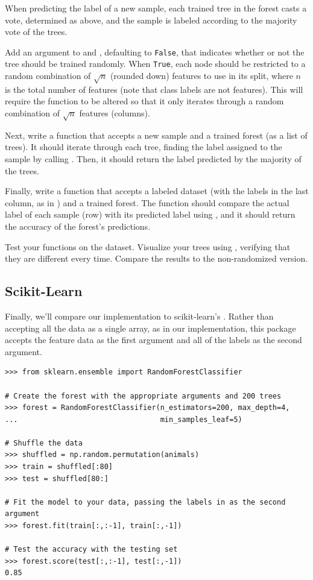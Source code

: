 When predicting the label of a new sample, each trained tree in the forest casts a vote, determined as above, and the sample is labeled according to the majority vote of the trees.

\begin{problem}
Add an argument  to  and , defaulting to \texttt{False}, that indicates whether or not the tree should be trained randomly.
When \texttt{True}, each node should be restricted to a random combination of $\sqrt{n}$ (rounded down) features to use in its split, where $n$ is the total number of features (note that class labels are not features).
This will require the function  to be altered so that it only iterates through a random combination of $\sqrt{n}$ features (columns).

Next, write a function  that accepts a new sample and a trained forest (as a list of trees).
It should iterate through each tree, finding the label assigned to the sample by calling .
Then, it should return the label predicted by the majority of the trees.

Finally, write a function  that accepts a labeled dataset (with the labels in the last column, as in ) and a trained forest.
The function should compare the actual label of each sample (row) with its predicted label using , and it should return the accuracy of the forest's predictions.

Test your functions on the  dataset.
Visualize your trees using , verifying that they are different every time.
Compare the results to the non-randomized version.
\end{problem}

\subsection*{Scikit-Learn}

Finally, we'll compare our implementation to scikit-learn's .
Rather than accepting all the data as a single array, as in our implementation, this package accepts the feature data as the first argument and all of the labels as the second argument.

\begin{lstlisting}
>>> from sklearn.ensemble import RandomForestClassifier

# Create the forest with the appropriate arguments and 200 trees
>>> forest = RandomForestClassifier(n_estimators=200, max_depth=4,
...									min_samples_leaf=5)

# Shuffle the data
>>> shuffled = np.random.permutation(animals)
>>> train = shuffled[:80]
>>> test = shuffled[80:]

# Fit the model to your data, passing the labels in as the second argument
>>> forest.fit(train[:,:-1], train[:,-1])

# Test the accuracy with the testing set
>>> forest.score(test[:,:-1], test[:,-1])
0.85
\end{lstlisting}


